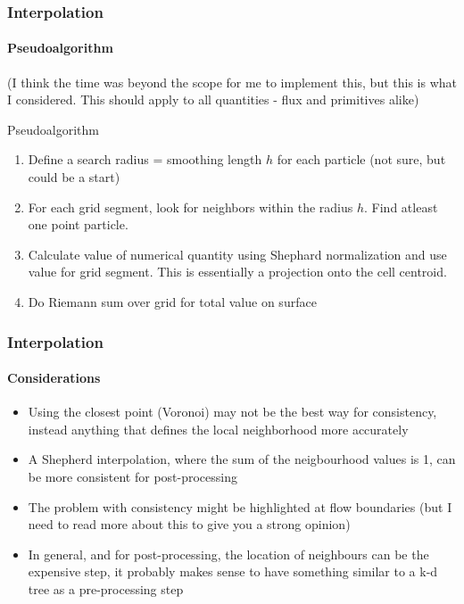 \documentclass[notheorems, aspectratio=169]{beamer}
\begin{document}
  \begin{frame}
    \frametitle{Interpolation}
    \framesubtitle{Pseudoalgorithm}

    (I think the time was beyond the scope for me to implement this, but this is what I considered. This should apply to all quantities - flux and primitives alike)
    \begin{block}{Pseudoalgorithm}
      \begin{enumerate}
        \item Define a search radius = smoothing length $h$ for each particle (not sure, but could be a start)
        \item For each grid segment, look for neighbors within the radius $h$. Find atleast one point particle.
        \item Calculate value of numerical quantity using Shephard normalization and use value for grid segment. This is essentially a projection onto the cell centroid.
        \item Do Riemann sum over grid for total value on surface 
      \end{enumerate}
    \end{block}

    
  \end{frame}
  
  \begin{frame}
    \frametitle{Interpolation}
    \framesubtitle{Considerations}

      \begin{itemize}
        \item Using the closest point (Voronoi) may not be the best way for consistency, instead anything that defines the local neighborhood more accurately
        \item A Shepherd interpolation, where the sum of the neigbourhood values is 1, can be more consistent for post-processing
        \item The problem with consistency might be highlighted at flow boundaries (but I need to read more about this to give you a strong opinion)
        \item In general, and for post-processing, the location of neighbours can be the expensive step, it probably makes sense to have something similar to a k-d tree as a pre-processing step
      \end{itemize}

    
  \end{frame}


  
\end{document}
